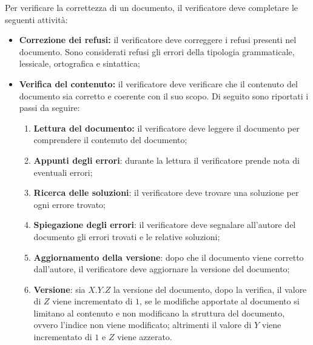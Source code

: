 Per verificare la correttezza di un documento, il verificatore deve
completare le seguenti attività:
\begin{itemize}
	\item \textbf{Correzione dei refusi:} il verificatore deve correggere i
	      refusi presenti nel documento. Sono considerati refusi gli errori
	      della tipologia grammaticale, lessicale, ortografica e sintattica;

	\item \textbf{Verifica del contenuto:} il verificatore deve verificare
	      che il contenuto del documento sia corretto e coerente con il suo
	      scopo. Di seguito sono riportati i passi da seguire:
	      \begin{enumerate}
		      \item \textbf{Lettura del documento:} il verificatore deve
		            leggere il documento per comprendere il contenuto del
		            documento;

		      \item \textbf{Appunti degli errori}: durante la lettura il
		            verificatore prende nota di eventuali errori;

		      \item \textbf{Ricerca delle soluzioni}: il verificatore deve
		            trovare una soluzione per ogni errore trovato;

		      \item \textbf{Spiegazione degli errori}: il verificatore deve
		            segnalare all'autore del documento gli errori trovati e le
		            relative soluzioni;

		      \item \textbf{Aggiornamento della versione}: dopo che il documento
		            viene corretto dall'autore, il verificatore deve aggiornare
		            la versione del documento;

		      \item \textbf{Versione}: sia $X.Y.Z$ la versione del documento,
		            dopo la verifica, il valore di $Z$ viene incrementato di
		            $1$, se le modifiche apportate al documento si limitano al
		            contenuto e non modificano la struttura del documento,
		            ovvero l'indice non viene modificato; altrimenti il valore
		            di $Y$ viene incrementato di $1$ e $Z$ viene azzerato.
	      \end{enumerate}
\end{itemize}
